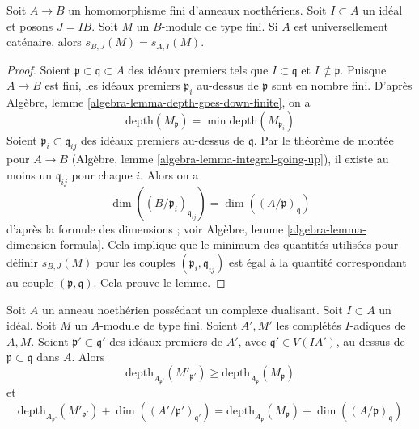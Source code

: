\begin{lemma}
\label{lemma-cutoff}
Soit $A \to B$ un homomorphisme fini d'anneaux noethériens. Soit $I \subset A$ un idéal et posons $J = IB$. Soit $M$ un $B$-module de type fini. Si $A$ est universellement caténaire, alors $s_{B, J}(M) = s_{A, I}(M)$.
\end{lemma}

\begin{proof}
Soient $\mathfrak p \subset \mathfrak q \subset A$ des idéaux premiers tels que $I \subset \mathfrak q$ et $I \not \subset \mathfrak p$. Puisque $A \to B$ est fini, les idéaux premiers $\mathfrak p_i$ au-dessus de $\mathfrak p$ sont en nombre fini. D'après Algèbre, lemme \ref{algebra-lemma-depth-goes-down-finite}, on a
$$
\text{depth}(M_\mathfrak p) = \min \text{depth}(M_{\mathfrak p_i})
$$
Soient $\mathfrak p_i \subset \mathfrak q_{ij}$ des idéaux premiers au-dessus de $\mathfrak q$. Par le théorème de montée pour $A \to B$ (Algèbre, lemme \ref{algebra-lemma-integral-going-up}), il existe au moins un $\mathfrak q_{ij}$ pour chaque $i$. Alors on a
$$
\dim((B/\mathfrak p_i)_{\mathfrak q_{ij}}) =
\dim((A/\mathfrak p)_\mathfrak q)
$$
d'après la formule des dimensions ; voir Algèbre, lemme \ref{algebra-lemma-dimension-formula}. Cela implique que le minimum des quantités utilisées pour définir $s_{B, J}(M)$ pour les couples $(\mathfrak p_i, \mathfrak q_{ij})$ est égal à la quantité correspondant au couple $(\mathfrak p, \mathfrak q)$. Cela prouve le lemme.
\end{proof}

\begin{lemma}
\label{lemma-change-completion}
Soit $A$ un anneau noethérien possédant un complexe dualisant. Soit $I \subset A$ un idéal. Soit $M$ un $A$-module de type fini. Soient $A', M'$ les complétés $I$-adiques de $A, M$. Soient $\mathfrak p' \subset \mathfrak q'$ des idéaux premiers de $A'$, avec $\mathfrak q' \in V(IA')$, au-dessus de $\mathfrak p \subset \mathfrak q$ dans $A$. Alors
$$
\text{depth}_{A_{\mathfrak p'}}(M'_{\mathfrak p'})
\geq
\text{depth}_{A_\mathfrak p}(M_\mathfrak p)
$$
et
$$
\text{depth}_{A_{\mathfrak p'}}(M'_{\mathfrak p'}) +
\dim((A'/\mathfrak p')_{\mathfrak q'}) =
\text{depth}_{A_\mathfrak p}(M_\mathfrak p) +
\dim((A/\mathfrak p)_\mathfrak q)
$$
\end{lemma}

